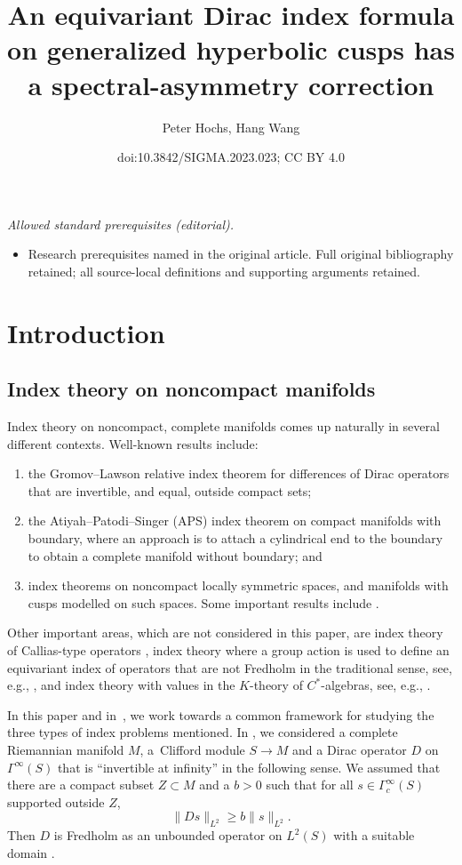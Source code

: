 \documentclass[10pt,a4paper]{amsart}
\title{An equivariant Dirac index formula on generalized hyperbolic cusps has a spectral-asymmetry correction}
\author{Peter Hochs, Hang Wang}
\date{doi:10.3842/SIGMA.2023.023; CC BY 4.0}
\numberwithin{equation}{section}
\begin{document}
\maketitle
\noindent\textit{Allowed standard prerequisites (editorial).}\begin{itemize}
\item Research prerequisites named in the original article. Full original bibliography retained; all source-local definitions and supporting arguments retained.
\end{itemize}\medskip
\section{Introduction}

\subsection*{Index theory on noncompact manifolds}

Index theory on noncompact, complete manifolds comes up naturally in several different contexts. Well-known results include:
\begin{enumerate}\itemsep=0pt
\item[(1)] the Gromov--Lawson relative index theorem \cite{Gromov83} for differences of Dirac operators that are invertible, and equal, outside compact sets;
\item[(2)] the Atiyah--Patodi--Singer (APS) index theorem \cite{APS1, Donnelly} on compact manifolds with boundary, where an approach is to attach a cylindrical end to the boundary to obtain a complete manifold without boundary; and
\item[(3)] index theorems on noncompact locally symmetric spaces, and manifolds with cusps modelled on such spaces. Some important results include \cite{BM, Moscovici82, Muller83, Muller87, Stern89}.
\end{enumerate}
Other important areas, which are not considered in this paper, are
index theory of Callias-type operators \cite{Anghel89, Anghel93, Bott78, Bunke95, Callias78, Kucerovsky01}, index theory where a group action is used to define an equivariant index of operators that are not Fredholm in the traditional sense, see, e.g., \cite{Atiyah74, Braverman02}, and index theory with values in the $K$-theory of $C^*$-algebras, see, e.g., \cite{Connes94}.

In this paper and in~\cite{HW21a}, we work towards a common framework for studying the three types of index problems mentioned. In \cite{HW21a}, we considered a complete Riemannian manifold $M$, a~Clifford module $S \to M$ and a Dirac operator $D$ on $\Gamma^{\infty}(S)$ that is ``invertible at infinity'' in the following sense. We assumed that there are a compact subset $Z \subset M$ and a $b>0$ such that for all $s \in \Gamma_c^{\infty}(S)$ supported outside $Z$,
\[
\|Ds\|_{L^2} \geq b \|s\|_{L^2}.
\]
Then $D$ is Fredholm as an unbounded operator on $L^2(S)$ with a suitable domain \cite{Anghel93b, Gromov83}.
\end{document}
